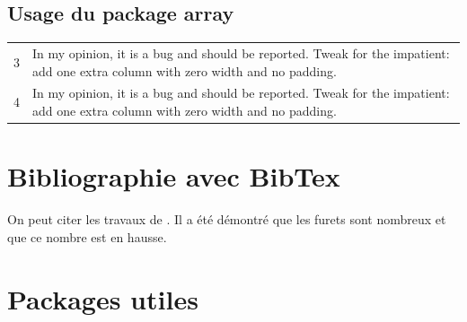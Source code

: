 \documentclass[a4paper, twoside, onecolumn, 10pt]{article}
\begin{document}
\subsection{Usage du package array}

\begin{tabular}{c|m{}}
3 & In my opinion, it is a bug and should be reported. Tweak for the impatient: add one extra column with zero width and no padding.  \\
4 & In my opinion, it is a bug and should be reported. Tweak for the impatient: add one extra column with zero width and no padding.  \\
\end{tabular}


\blindtext[2]

\section{Bibliographie avec BibTex}

On peut citer les travaux de \citet{ferrets_rats}. Il a été démontré que les furets sont nombreux \citep{PMID2899444} et que ce nombre est en hausse. 



\section{Packages utiles}
\end{document}
